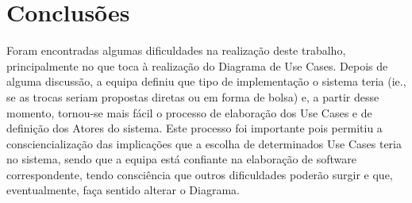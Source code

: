 \documentclass[a4paper]{article}
\begin{document}
\section{Conclusões}
Foram encontradas algumas dificuldades na realização deste trabalho, principalmente no que toca à realização do Diagrama de Use Cases. Depois de alguma discussão, a equipa definiu que tipo de implementação o sistema teria (ie., se as trocas seriam propostas diretas ou em forma de bolsa) e, a partir desse momento, tornou-se mais fácil o processo de elaboração dos Use Cases e de definição dos Atores do sistema. Este processo foi importante pois permitiu a consciencialização das implicações que a escolha de determinados Use Cases teria no sistema, sendo que a equipa está confiante na elaboração de software correspondente, tendo consciência que outros dificuldades poderão surgir e que, eventualmente, faça sentido alterar o Diagrama.
\label{sec:4}

\hspace{3mm}
\end{document}
